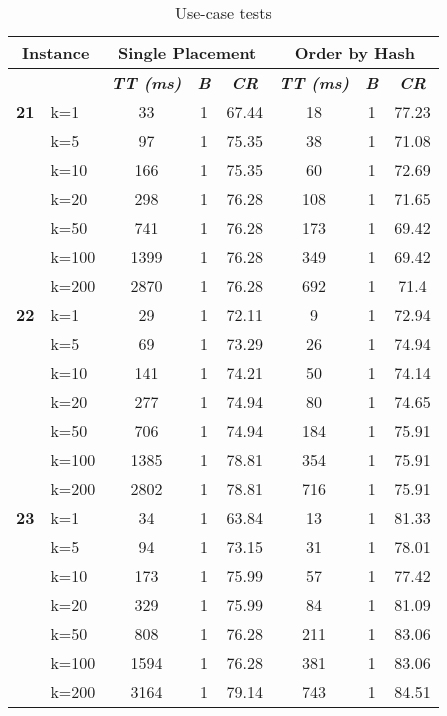     \begin{table}[htbp]
    \caption{Use-case tests}
    \begin{tabular}{|l|l|c|c|c|c|c|c|}
    
    \multicolumn{ 2}{|c|}{\textbf{Instance}} & \multicolumn{ 3}{c|}{\textbf{Single Placement}} & \multicolumn{ 3}{c|}{\textbf{Order by Hash}} \\ \hline
    \multicolumn{ 2}{|l|}{} & \textbf{\textit{TT (ms)}} & \textbf{\textit{B}} & \textbf{\textit{CR}} & \textbf{\textit{TT (ms)}} & \textbf{\textit{B}} & \textbf{\textit{CR}} \\ \hline
    \multicolumn{1}{|r|}{\textbf{21}} & k=1 & 33 & 1 & 67.44 & 18 & 1 & 77.23 \\ 
     & k=5 & 97 & 1 & 75.35 & 38 & 1 & 71.08 \\ 
     & k=10 & 166 & 1 & 75.35 & 60 & 1 & 72.69 \\ 
     & k=20 & 298 & 1 & 76.28 & 108 & 1 & 71.65 \\ 
     & k=50 & 741 & 1 & 76.28 & 173 & 1 & 69.42 \\ 
     & k=100 & 1399 & 1 & 76.28 & 349 & 1 & 69.42 \\ 
     & k=200 & 2870 & 1 & 76.28 & 692 & 1 & 71.4 \\ \hline
    \multicolumn{1}{|r|}{\textbf{22}} & k=1 & 29 & 1 & 72.11 & 9 & 1 & 72.94 \\ 
     & k=5 & 69 & 1 & 73.29 & 26 & 1 & 74.94 \\ 
     & k=10 & 141 & 1 & 74.21 & 50 & 1 & 74.14 \\ 
     & k=20 & 277 & 1 & 74.94 & 80 & 1 & 74.65 \\ 
     & k=50 & 706 & 1 & 74.94 & 184 & 1 & 75.91 \\ 
     & k=100 & 1385 & 1 & 78.81 & 354 & 1 & 75.91 \\ 
     & k=200 & 2802 & 1 & 78.81 & 716 & 1 & 75.91 \\ \hline
    \multicolumn{1}{|r|}{\textbf{23}} & k=1 & 34 & 1 & 63.84 & 13 & 1 & 81.33 \\ 
     & k=5 & 94 & 1 & 73.15 & 31 & 1 & 78.01 \\ 
     & k=10 & 173 & 1 & 75.99 & 57 & 1 & 77.42 \\ 
     & k=20 & 329 & 1 & 75.99 & 84 & 1 & 81.09 \\ 
     & k=50 & 808 & 1 & 76.28 & 211 & 1 & 83.06 \\ 
     & k=100 & 1594 & 1 & 76.28 & 381 & 1 & 83.06 \\ 
     & k=200 & 3164 & 1 & 79.14 & 743 & 1 & 84.51 \\ \hline

\end{tabular}
\end{table}
